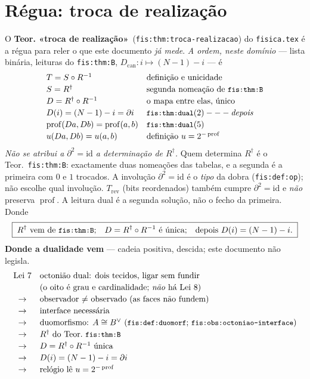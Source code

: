 \documentclass[11pt,a4paper]{article}
\newcommand{\code}[1]{\texttt{\small #1}}
\newcommand{\fis}[2]{\textbf{#2}~\textnormal{(\code{#1})}}
\begin{document}
\section{Régua: troca de realização}\label{redes:troca}

\noindent O \fis{fis:thm:troca-realizacao}{Teor. «troca de realização»} do
\code{fisica.tex} é a régua para reler o que este documento \emph{já mede}.
\emph{A ordem, neste domínio} --- lista binária, leituras do \code{fis:thm:B},
$D_{\mathrm{can}}\colon i\mapsto(N-1)-i$ --- é
\[
\begin{array}{@{}ll@{}}
T=S\circ R^{-1}
  & \text{definição e unicidade}\\[2pt]
S=R^{\dagger}
  & \text{segunda nomeação de \code{fis:thm:B}}\\[2pt]
D=R^{\dagger}\circ R^{-1}
  & \text{o mapa entre elas, único}\\[2pt]
D(i)=(N-1)-i=\partial i
  & \code{fis:thm:dual}(2) --- \emph{depois}\\[2pt]
\operatorname{prof}(Da,Db)=\operatorname{prof}(a,b)
  & \code{fis:thm:dual}(5)\\[2pt]
u(Da,Db)=u(a,b)
  & \text{definição }u=2^{-\operatorname{prof}}
\end{array}
\]
\emph{Não se atribui a $\partial^{2}=\mathrm{id}$ a determinação de $R^{\dagger}$.}
Quem determina $R^{\dagger}$ é o Teor.~\code{fis:thm:B}: exactamente duas
nomeações das tabelas, e a segunda é a primeira com $0$ e $1$ trocados.
A involução $\partial^{2}=\mathrm{id}$ é o \emph{tipo} da dobra
(\code{fis:def:op}); não escolhe qual involução. $T_{\mathrm{rev}}$ (bits
reordenados) também cumpre $\partial^{2}=\mathrm{id}$ e \emph{não} preserva
$\operatorname{prof}$. A leitura dual é a segunda solução, não o fecho da
primeira. Donde
\[
\boxed{\;
R^{\dagger}\text{ vem de \code{fis:thm:B};}\quad
D=R^{\dagger}\circ R^{-1}\text{ é única;}\quad
\text{depois }D(i)=(N-1)-i.
\;}
\]
\medskip\noindent\textbf{Donde a dualidade vem} --- cadeia positiva, descida;
este documento não legisla.
\[
\begin{array}{@{}cl@{}}
\text{Lei~7} & \text{octonião dual: dois tecidos, ligar sem fundir}\\[2pt]
& \text{(o oito é grau e cardinalidade; \emph{não} há Lei~8)}\\[2pt]
\to & \text{observador $\neq$ observado (as faces não fundem)}\\[2pt]
\to & \text{interface necessária}\\[2pt]
\to & \text{duomorfismo: $A\cong B^{\vee}$ (\code{fis:def:duomorf}; \code{fis:obs:octoniao-interface})}\\[2pt]
\to & R^{\dagger}\text{ do Teor.\ \code{fis:thm:B}}\\[2pt]
\to & D=R^{\dagger}\circ R^{-1}\text{ única}\\[2pt]
\to & D(i)=(N-1)-i=\partial i\\[2pt]
\to & \text{relógio lê }u=2^{-\operatorname{prof}}
\end{array}
\]
\end{document}
